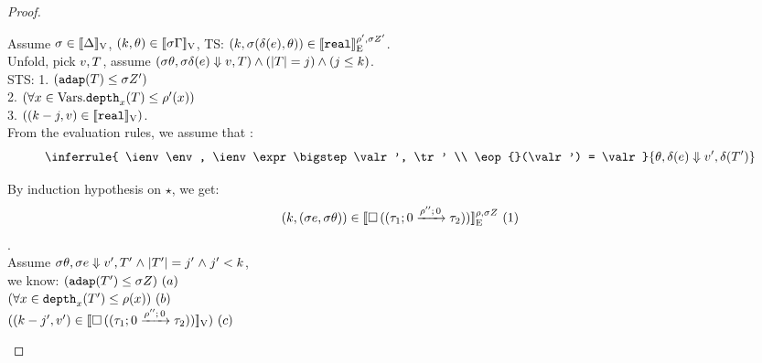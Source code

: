 \documentclass[a4paper,11pt]{article}
\theoremstyle{definition}
\begin{document}
\begin{proof}
\begin{mainitem}
Assume $ \ienv \in \lrv{\Delta}$, $(\stepiA, \env) \in \lrv{\ienv \Gamma}$, TS: $(\stepiA, \ienv (\eop(\expr), \env)) \in \lre{\dmap'}{\ienv \nnatA'}{\treal}$.\\
%
Unfold, pick $\valr, \tr$, assume  $(\ienv \env, \ienv \eop(\expr) \bigstep \valr, \tr) \land (\size{\tr} = j) \land (j \leq \stepiA)$.\\
%
STS: 
1.
$(\adap(\tr) \leq \ienv \nnatA') $ \\ 
2. $ (\forall x \in \mbox{Vars}. \ddep{x}(\tr) \leq \dmap'(x)) $ \\
3.  $ ((\stepiA - j, \valr) \in \lrv{\treal})$.\\
%
From the evaluation rules, we assume that :
\[
 \inferrule{
    \ienv \env, \ienv \expr \bigstep \valr', \tr' \\
    \eop{}(\valr') = \valr
  }{
    \env, \eop(\expr) \bigstep \valr', \trop(\tr')
  }
\]

By induction hypothesis on $\star$, we get:
 \[
(\stepiA, (\ienv \expr, \ienv \env)) \in \lre{\dmap}{\ienv \nnatA}{\tbox{
    (\tarr{ \type_1}{ \type_2 }{0}{\dmap''}{0})}} ~ (1)
\].\\
%
Assume $\ienv \env, \ienv \expr \bigstep \valr', \tr' \conj |\tr'|=j'
\conj j' < \stepiA$,\\
 we know: $(\adap(\tr') \leq \ienv \nnatA) ~ (a) $ \\
$ (\forall x \in \ddep{x}(\tr') \leq \dmap(x)) ~ (b)$ \\
$ ((\stepiA - j', \valr') \in \lrv{\tbox{  (\tarr{ \type_1}{
      \type_2 }{0}{\dmap''}{0})     }}) ~ (c)$ \\


\end{mainitem}
\end{proof}
\end{document}
